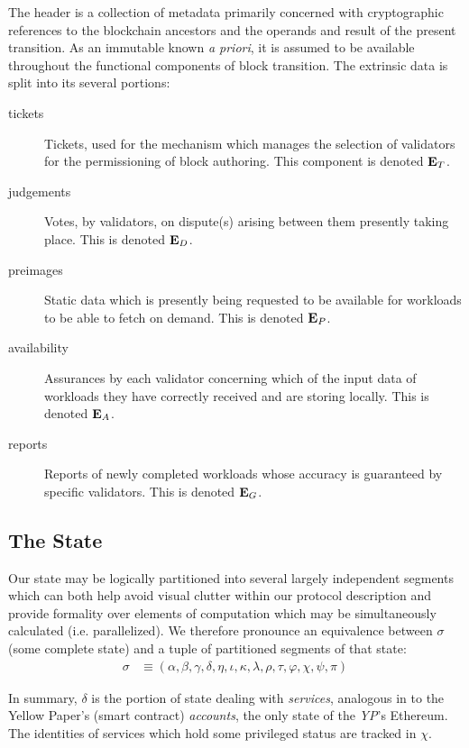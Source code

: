 The header is a collection of metadata primarily concerned with cryptographic references to the blockchain ancestors and the operands and result of the present transition. As an immutable known \emph{a priori}, it is assumed to be available throughout the functional components of block transition. The extrinsic data is split into its several portions:

\begin{description}
  \item[tickets] Tickets, used for the mechanism which manages the selection of validators for the permissioning of block authoring. This component is denoted $\mathbf{E}_T$.
  \item[judgements] Votes, by validators, on dispute(s) arising between them presently taking place. This is denoted $\mathbf{E}_D$.
  \item[preimages] Static data which is presently being requested to be available for workloads to be able to fetch on demand. This is denoted $\mathbf{E}_P$.
  \item[availability] Assurances by each validator concerning which of the input data of workloads they have correctly received and are storing locally. This is denoted $\mathbf{E}_A$.
  \item[reports] Reports of newly completed workloads whose accuracy is guaranteed by specific validators. This is denoted $\mathbf{E}_G$.
\end{description}

\subsection{The State}

Our state may be logically partitioned into several largely independent segments which can both help avoid visual clutter within our protocol description and provide formality over elements of computation which may be simultaneously calculated (i.e. parallelized). We therefore pronounce an equivalence between $\sigma$ (some complete state) and a tuple of partitioned segments of that state:
\begin{align}\label{eq:statecomposition}
  \sigma &\equiv (\alpha, \beta, \gamma, \delta, \eta, \iota, \kappa, \lambda, \rho, \tau, \varphi, \chi, \psi, \pi)
\end{align}

In summary, $\delta$ is the portion of state dealing with \emph{services}, analogous in \Jam to the Yellow Paper's (smart contract) \emph{accounts}, the only state of the \emph{YP}'s Ethereum. The identities of services which hold some privileged status are tracked in $\chi$.

